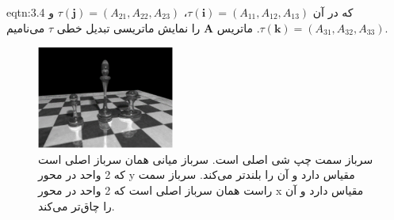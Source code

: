 {\begin{spacing}{1.5}
\begin{eqtn}{eqtn:3.4}
            که در آن $\tau(\textbf{i})=(A_{11},A_{12},A_{13})$، $\tau(\textbf{j})=(A_{21},A_{22},A_{23})$ و $\tau(\textbf{k})=(A_{31},A_{32},A_{33})$.
            ماتریس $\textbf{A}$ را نمایش ماتریسی تبدیل خطی $\tau$ می‌نامیم.
        \end{eqtn}
        \begin{figure}[H]
            \centering
            \setlength{\belowcaptionskip}{-10pt}
            \includegraphics[width=0.4\textwidth]{Images/4/3/4.Session.1.3.1}
            \caption {سرباز سمت چپ شی اصلی است.
            سرباز میانی همان سرباز اصلی است که 2 واحد در محور y مقیاس دارد و آن را بلندتر می‌کند.
            سرباز سمت راست همان سرباز اصلی است که 2 واحد در محور x مقیاس دارد و آن را چاق‌تر می‌کند.}
            \label{fig:4.Session.1.3.1}
        \end{figure}
    \end{spacing}
}

